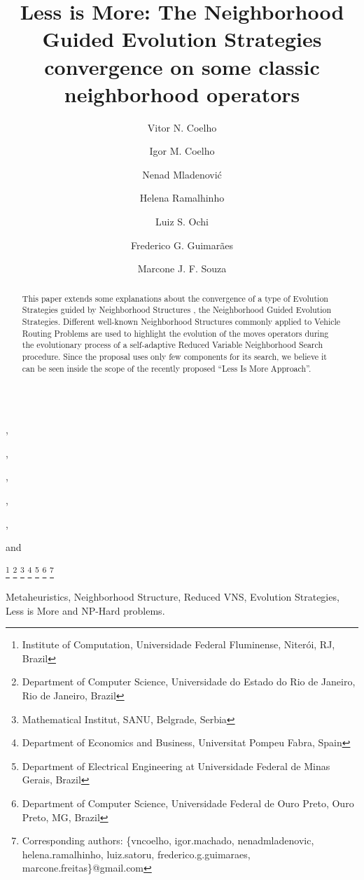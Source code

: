 \documentclass{endm}
\begin{document}
\begin{verbatim}\end{verbatim}\vspace{2.5cm}

\begin{frontmatter}

\title{Less is More: The Neighborhood Guided Evolution Strategies convergence on some classic neighborhood operators}


\author{Vitor N. Coelho},
\author{Igor M. Coelho},
\author{Nenad Mladenovi{\'c}},
\author{Helena Ramalhinho},
\author{Luiz S. Ochi},
\author{Frederico G. Guimar{\~a}es} and
\author{Marcone J. F. Souza}

\thanks[address1]{Institute of Computation, Universidade Federal Fluminense, Niter\'oi, RJ, Brazil}
\thanks[address2]{Department of Computer Science, Universidade do Estado do Rio de Janeiro, Rio de Janeiro, Brazil}
\thanks[address3]{Mathematical Institut, SANU, Belgrade, Serbia}
\thanks[address4]{Department of Economics and Business, Universitat Pompeu Fabra, Spain}
\thanks[address5]{Department of Electrical Engineering at Universidade Federal de Minas Gerais, Brazil}
\thanks[address6]{Department of Computer Science, Universidade Federal de Ouro Preto, Ouro Preto, MG, Brazil}
\thanks[address7]{Corresponding authors: \{vncoelho, igor.machado, nenadmladenovic, helena.ramalhinho, luiz.satoru, frederico.g.guimaraes, marcone.freitas\}@gmail.com}

\vspace{-0.5cm}


\begin{abstract}
This paper extends some explanations about the convergence of a type of Evolution Strategies guided by Neighborhood Structures \cite{Coelho2016MIT}, the Neighborhood Guided Evolution Strategies.
Different well-known Neighborhood Structures commonly applied to Vehicle Routing Problems are used to highlight the evolution of the moves operators during the evolutionary process of a self-adaptive Reduced Variable Neighborhood Search procedure.
Since the proposal uses only few components for its search, we believe it can be seen inside the scope of the recently proposed ``Less Is More Approach''. 
\end{abstract}

\begin{keyword}
Metaheuristics, 
Neighborhood Structure, 
Reduced VNS, 
Evolution Strategies, 
Less is More and NP-Hard problems.
\end{keyword}

\end{frontmatter}
\end{document}
